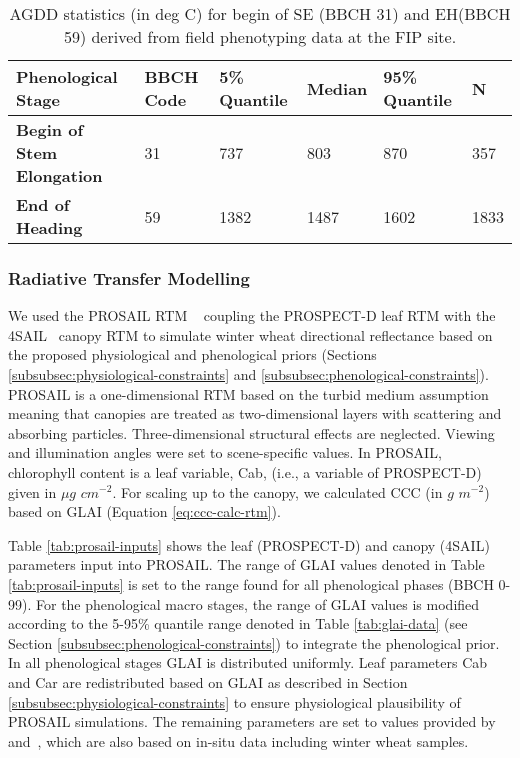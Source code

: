 \begin{table}[H]
\caption{AGDD statistics (in deg C) for begin of SE (BBCH 31) and EH(BBCH 59) derived from field phenotyping data at the FIP site.}
\label{tab:bbch-agdd}
\begin{tabularx}{\textwidth}{p{5cm}p{1.5cm}p{1.8cm}p{1.8cm}p{1.8cm}p{0.8cm}}
\toprule
\textbf{Phenological Stage}       & \textbf{BBCH Code}  & \textbf{5\% Quantile} & \textbf{Median} & \textbf{95\% Quantile} & \textbf{N} \\ \midrule
\textbf{Begin of Stem Elongation} & 31            &  737    & 803        & 870  & 357        \\
\textbf{End of Heading}           & 59            & 1382    & 1487       & 1602   & 1833      \\ \bottomrule
\end{tabularx}
\end{table}


\subsubsection{Radiative Transfer Modelling}
We used the PROSAIL \gls{RTM} ~\citep{jacquemoud_prospectsail_2009} coupling the PROSPECT-D leaf \gls{RTM} \citep{feret_prospect-d_2017} with the 4SAIL~\citep{verhoef_light_1984} canopy \gls{RTM} to simulate winter wheat directional reflectance based on the proposed physiological and phenological priors (Sections \ref{subsubsec:physiological-constraints} and \ref{subsubsec:phenological-constraints}). PROSAIL is a one-dimensional \gls{RTM} based on the turbid medium assumption meaning that canopies are treated as two-dimensional layers with scattering and absorbing particles. Three-dimensional structural effects are neglected. Viewing and illumination angles were set to scene-specific values. In PROSAIL, chlorophyll content is a leaf variable, Cab, (i.e., a variable of PROSPECT-D) given in $\mu g$ $cm^{-2}$. For scaling up to the canopy, we calculated \gls{CCC} (in $g$ $m^{-2}$) based on \gls{GLAI} (Equation \ref{eq:ccc-calc-rtm}).

Table \ref{tab:prosail-inputs} shows the leaf (PROSPECT-D) and canopy (4SAIL) parameters input into PROSAIL. The range of \gls{GLAI} values denoted in Table \ref{tab:prosail-inputs} is set to the range found for all phenological phases (BBCH 0-99). For the phenological macro stages, the range of \gls{GLAI} values is modified according to the 5-95\% quantile range denoted in Table \ref{tab:glai-data} (see Section \ref{subsubsec:phenological-constraints}) to integrate the phenological prior. In all phenological stages \gls{GLAI} is distributed uniformly. Leaf parameters \gls{Cab} and Car are redistributed based on \gls{GLAI} as described in Section \ref{subsubsec:physiological-constraints} to ensure physiological plausibility of PROSAIL simulations. The remaining parameters are set to values provided by~\cite{wocher_rtm-based_2020} and~\cite{danner_efficient_2021}, which are also based on in-situ data including winter wheat samples.

